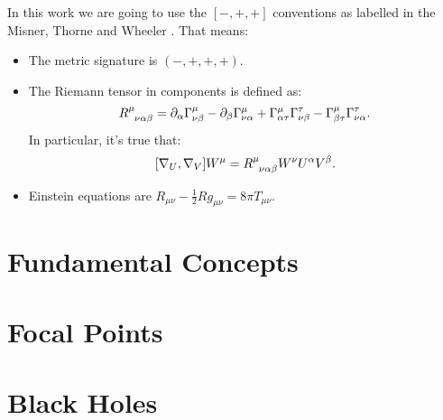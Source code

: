 \documentclass[12pt, a4paper]{book}
\begin{document}
In this work we are going to use the \([-, + , +]\) conventions as labelled in the Misner, Thorne and Wheeler \cite{misner1973gravitation}. That means:
\begin{itemize}
	\item[\ding{99}] The metric signature is \((-, +, +, +)\).
	\item[\ding{99}]  The Riemann tensor in components is defined as:
	\[
	R\indices{^{\mu}_{\nu\alpha\beta}} = \partial_{\alpha}\Gamma^{\mu}_{\nu\beta} - \partial_{\beta}\Gamma^{\mu}_{\nu\alpha} + \Gamma^{\mu}_{\alpha\tau}\Gamma^{\tau}_{\nu\beta} - \Gamma^{\mu}_{\beta\tau}\Gamma^{\tau}_{\nu\alpha}.
	\]
	In particular, it's true that:
	\[
	[\nabla_U, \nabla_V] W^{\mu} = R\indices{^{\mu}_{\nu\alpha\beta}}W^{\nu}U^{\alpha}V^{\beta}.
	\]
	\item[\ding{99}]  Einstein equations are \(R_{\mu\nu} - \frac{1}{2}Rg_{\mu\nu} = 8\pi T_{\mu\nu}\).
\end{itemize}

\chapter{Fundamental Concepts}


\chapter{Focal Points}


\chapter{Black Holes}


\printbibliography
\end{document}
